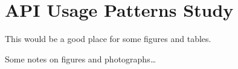 \chapter{API Usage Patterns Study}
This would be a good place for some figures and tables.

Some notes on figures and photographs\ldots
